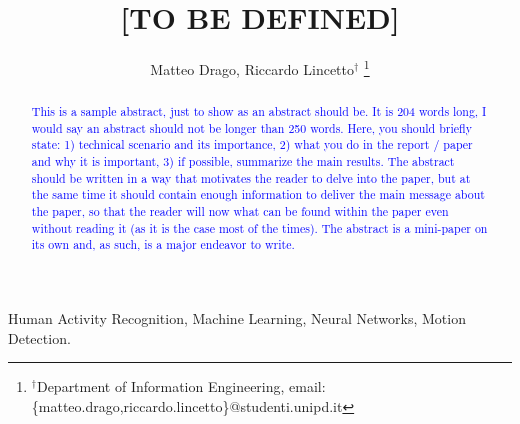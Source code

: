 \documentclass[10pt, conference, letterpaper]{IEEEtran}
\title{[TO BE DEFINED]}
\author{Matteo Drago, Riccardo Lincetto$^\dag$
\thanks{$^\dag$Department of Information Engineering, email: \{matteo.drago,riccardo.lincetto\}@studenti.unipd.it}
}
\newcommand\MR[1]{\textcolor{blue}{#1}}
\begin{document}
\maketitle

\begin{abstract}
\MR{This is a sample abstract, just to show as an abstract should be. It is 204 words long, I would say an abstract should not be longer than 250 words. Here, you should briefly state: 1) technical scenario and its importance, 2) what you do in the report / paper and why it is important, 3) if possible, summarize the main results. The abstract should be written in a way that motivates the reader to delve into the paper, but at the same time it should contain enough information to deliver the main message about the paper, so that the reader will now what can be found within the paper even without reading it (as it is the case most of the times). The abstract is a mini-paper on its own and, as such, is a major endeavor to write.}
\end{abstract}

\IEEEkeywords
Human Activity Recognition, Machine Learning, Neural Networks, Motion Detection. 
\endIEEEkeywords














\end{document}

